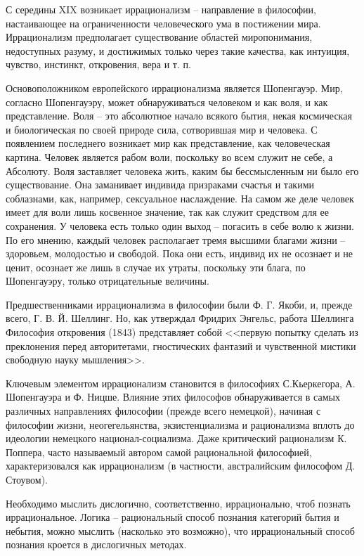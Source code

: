 
С середины XIX возникает иррационализм -- направление в философии, настаивающее на ограниченности 
человеческого ума в постижении мира. Иррационализм предполагает существование областей миропонимания, 
недоступных разуму, и достижимых только через такие качества, как интуиция, чувство, инстинкт, откровения, 
вера и т. п.

Основоположником европейского иррационализма является Шопенгауэр. Мир, согласно Шопенгауэру, может 
обнаруживаться человеком и как воля, и как представление. Воля -- это абсолютное начало всякого бытия, некая 
космическая и биологическая по своей природе сила, сотворившая мир и человека. С появлением последнего 
возникает мир как представление, как человеческая картина. Человек является рабом воли, поскольку во всем 
служит не себе, а Абсолюту. Воля заставляет человека жить, каким бы бессмысленным ни было его существование. 
Она заманивает индивида призраками счастья и такими соблазнами, как, например, сексуальное наслаждение. На 
самом же деле человек имеет для воли лишь косвенное значение, так как служит средством для ее сохранения. У 
человека есть только один выход -- погасить в себе волю к жизни. По его мнению, каждый человек располагает 
тремя высшими благами жизни -- здоровьем, молодостью и свободой. Пока они есть, индивид их не осознает и не 
ценит, осознает же лишь в случае их утраты, поскольку эти блага, по Шопенгауэру, только отрицательные 
величины. 

Предшественниками иррационализма в философии были Ф. Г. Якоби, и, прежде всего, Г. В. Й. Шеллинг. Но, как 
утверждал Фридрих Энгельс, работа Шеллинга Философия откровения (1843) представляет собой <<первую попытку 
сделать из преклонения перед авторитетами, гностических фантазий и чувственной мистики свободную науку 
мышления>>.

Ключевым элементом иррационализм становится в философиях С.Кьеркегора, А. Шопенгауэра и Ф. Ницше. Влияние 
этих философов обнаруживается в самых различных направлениях философии (прежде всего немецкой), начиная с 
философии жизни, неогегельянства, экзистенциализма и рационализма вплоть до идеологии немецкого 
национал-социализма. Даже критический рационализм К. Поппера, часто называемый автором самой рациональной 
философией, характеризовался как иррационализм (в частности, австралийским философом Д. Стоувом).

Необходимо мыслить дислогично, соответственно, иррационально, чтоб познать иррациональное. Логика -- 
рациональный способ познания категорий бытия и небытия, можно мыслить (насколько это возможно), что 
иррациональный способ познания кроется в дислогичных методах.

